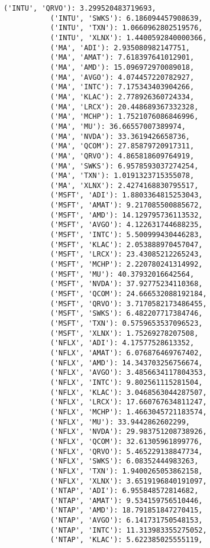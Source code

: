 \documentclass[11pt]{article}
\begin{document}
\begin{Verbatim}[commandchars=\\\{\}]
           ('INTU', 'QRVO'): 3.299520483719693,
           ('INTU', 'SWKS'): 6.186094457908639,
           ('INTU', 'TXN'): 1.0660962802519576,
           ('INTU', 'XLNX'): 1.4400592840000366,
           ('MA', 'ADI'): 2.935080982147751,
           ('MA', 'AMAT'): 7.618397641012901,
           ('MA', 'AMD'): 15.096972970089018,
           ('MA', 'AVGO'): 4.074457220782927,
           ('MA', 'INTC'): 7.175343403904266,
           ('MA', 'KLAC'): 2.778926360724334,
           ('MA', 'LRCX'): 20.448689367332328,
           ('MA', 'MCHP'): 1.7521076086846996,
           ('MA', 'MU'): 36.66557007389974,
           ('MA', 'NVDA'): 33.3619426658736,
           ('MA', 'QCOM'): 27.85879720917311,
           ('MA', 'QRVO'): 4.865818609764919,
           ('MA', 'SWKS'): 6.9578593037274254,
           ('MA', 'TXN'): 1.0191323715355078,
           ('MA', 'XLNX'): 2.4274168830795517,
           ('MSFT', 'ADI'): 1.8803364815253043,
           ('MSFT', 'AMAT'): 9.217085500885672,
           ('MSFT', 'AMD'): 14.129795736113532,
           ('MSFT', 'AVGO'): 4.122631744688235,
           ('MSFT', 'INTC'): 5.500999430446283,
           ('MSFT', 'KLAC'): 2.053888970457047,
           ('MSFT', 'LRCX'): 23.43085212265243,
           ('MSFT', 'MCHP'): 2.220780241314992,
           ('MSFT', 'MU'): 40.37932016642564,
           ('MSFT', 'NVDA'): 37.92775234110368,
           ('MSFT', 'QCOM'): 24.666532088192184,
           ('MSFT', 'QRVO'): 3.7170582173486455,
           ('MSFT', 'SWKS'): 6.482207717384746,
           ('MSFT', 'TXN'): 0.5759653537096523,
           ('MSFT', 'XLNX'): 1.75269278207508,
           ('NFLX', 'ADI'): 4.17577528613352,
           ('NFLX', 'AMAT'): 6.076876469767402,
           ('NFLX', 'AMD'): 14.343703256756674,
           ('NFLX', 'AVGO'): 3.4856634117804353,
           ('NFLX', 'INTC'): 9.802561115281504,
           ('NFLX', 'KLAC'): 3.0468563044287507,
           ('NFLX', 'LRCX'): 17.660767634811247,
           ('NFLX', 'MCHP'): 1.4663045721183574,
           ('NFLX', 'MU'): 33.9442862602299,
           ('NFLX', 'NVDA'): 29.983751208738926,
           ('NFLX', 'QCOM'): 32.61305961899776,
           ('NFLX', 'QRVO'): 5.465229138847734,
           ('NFLX', 'SWKS'): 6.08352444983263,
           ('NFLX', 'TXN'): 1.9400265053862158,
           ('NFLX', 'XLNX'): 3.6519196840191097,
           ('NTAP', 'ADI'): 6.955848572814682,
           ('NTAP', 'AMAT'): 9.534159756510446,
           ('NTAP', 'AMD'): 18.791851847270415,
           ('NTAP', 'AVGO'): 6.141731750548153,
           ('NTAP', 'INTC'): 11.313983355275052,
           ('NTAP', 'KLAC'): 5.622385025555119,

\end{Verbatim}
\end{document}
